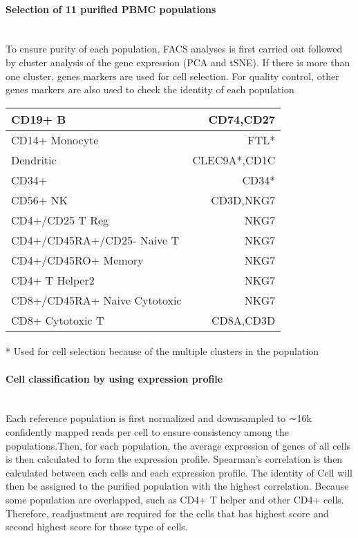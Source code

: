 \documentclass{article}
\begin{document}
\paragraph{Selection of 11 purified PBMC populations} ~\\
To ensure purity of each population, FACS analyses is first carried out followed by cluster analysis of the gene expression (PCA and tSNE). If there is more than one cluster, genes markers are used for cell selection. For quality control, other genes markers are also used to check the identity of each population \\
\par
\begin{tabular}{ |l| r| }
\hline
CD19+ B&CD74,CD27 \\ \hline
CD14+ Monocyte&FTL* \\ \hline       
Dendritic&CLEC9A*,CD1C \\ \hline     
CD34+&CD34*\\ \hline
CD56+ NK&CD3D,NKG7 \\ \hline
CD4+/CD25 T Reg& NKG7 \\ \hline
CD4+/CD45RA+/CD25- Naive T&NKG7 \\ \hline
CD4+/CD45RO+ Memory&NKG7 \\ \hline
CD4+ T Helper2&NKG7 \\ \hline
CD8+/CD45RA+ Naive Cytotoxic& NKG7 \\ \hline 
CD8+ Cytotoxic T&CD8A,CD3D\\ \hline
\end{tabular}
\par
\paragraph{}
* Used for cell selection because of the multiple clusters in the population
\paragraph{Cell classification by using expression profile } ~\\
Each reference population is first normalized and downsampled to ∼16k confidently mapped reads per cell to ensure consistency among the populations.Then, for each population, the average expression of genes of all cells is then calculated to form the expression profile. Spearman’s correlation is then calculated between each cells and each expression profile. The identity of Cell will then be assigned to the purified population with the highest correlation. Because some population are overlapped, such as CD4+ T helper and other CD4+ cells. Therefore, readjustment are required for the cells that has highest score and second highest score for those type of cells.     
\end{document}
